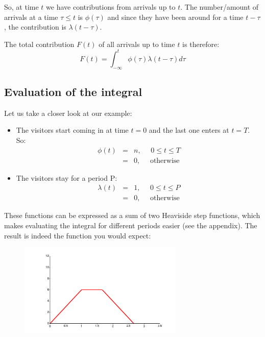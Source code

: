 \documentclass[onecolumn]{article}
\begin{document}
So, at time $t$ we have contributions from arrivals up to $t$. The number/amount of arrivals at a time $\tau \leq t$
is $\phi(\tau)$ and since they have been around for a time $t-\tau$, the contribution is $\lambda(t-\tau)$.

The total contribution $F(t)$ of all arrivals up to time $t$ is therefore:
\begin{equation}
\label{contribution}
    F(t) = \int^t_{-\infty} \phi(\tau) \lambda(t-\tau) d\tau
\end{equation}

\subsection*{Evaluation of the integral}

Let us take a closer look at our example:
\begin{itemize}
\item
The visitors start coming in at time $t = 0$ and the last one enters at $t = T$. So:
\begin{eqnarray}
            \phi(t) &=& n, ~~~~~~ 0 \leq t \leq T \\
\nonumber           &=& 0, ~~~~~~ \textrm{otherwise}
\end{eqnarray}
\item
The visitors stay for a period P:
\begin{eqnarray}
          \lambda(t) &=& 1, ~~~~~~ 0 \leq t \leq P \\
\nonumber            &=& 0, ~~~~~~ \textrm{otherwise}
\end{eqnarray}
\end{itemize}

These functions can be expressed as a sum of two Heaviside step functions, which makes evaluating the integral
for different periods easier (see the appendix). The result is indeed the function you would expect:

\begin{figure}[h]
\begin{center}
\includegraphics[width=0.7\textwidth]{number_visitors_smooth.pdf}
\label{visitorsSmooth}
\end{center}
\end{figure}
\end{document}
